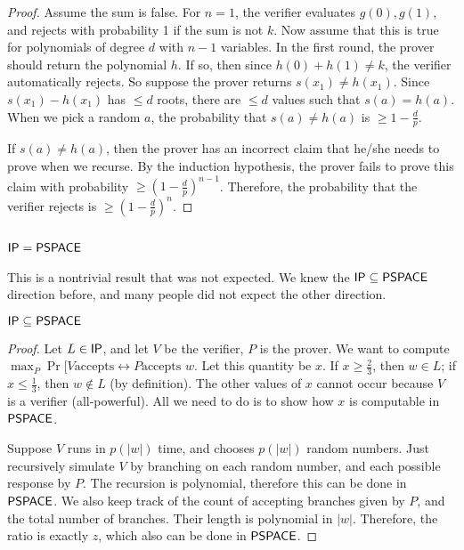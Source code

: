 \begin{proof}
\par Assume the sum is false. For $n=1$, the verifier evaluates $g(0), g(1)$, and rejects with probability 1 if the sum is not $k$. Now assume that this is true for polynomials of degree $d$ with $n-1$ variables. In the first round, the prover should return the polynomial $h$. If so, then since $h(0) + h(1) \ne k$, the verifier automatically rejects. So suppose the prover returns $s(x_1) \ne h(x_1)$. Since $s(x_1) - h(x_1)$ has $\le d$ roots, there are $\le d$ values such that $s(a) = h(a)$. When we pick a random $a$, the probability that $s(a) \ne h(a)$ is $\ge 1-\frac{d}{p}$. 

\par If $s(a) \ne h(a)$, then the prover has an incorrect claim that he/she needs to prove when we recurse. By the induction hypothesis, the prover fails to prove this claim with probability $\ge (1-\frac{d}{p})^{n-1}$. Therefore, the probability that the verifier rejects is $\ge (1-\frac{d}{p})^n$. 
\end{proof}



\subsection{${\mathsf{IP}} = {\mathsf{PSPACE}}$}
This is a nontrivial result that was not expected. We knew the ${\mathsf{IP}} \subseteq {\ensuremath{\mathsf{PSPACE}}}$ direction before, and many people did not expect the other direction. 
\begin{theorem}
${\mathsf{IP}} \subseteq {\ensuremath{\mathsf{PSPACE}}}$
\end{theorem}

\begin{proof}
Let $L \in {\ensuremath{\mathsf{IP}}}$, and let $V$ be the verifier, $P$ is the prover. We want to compute $\max_{P}\Pr[V \text{accepts} \leftrightarrow P \text{accepts $w$}$. Let this quantity be $x$. If $x \ge \frac{2}{3}$, then $w \in L$; if $x \le \frac{1}{3}$, then $w \notin L$ (by definition). The other values of $x$ cannot occur because $V$ is a verifier (all-powerful). All we need to do is to show how $x$ is computable in ${\mathsf{PSPACE}}$.

\par Suppose $V$ runs in $p(|w|)$ time, and chooses $p(|w|)$ random numbers. Just recursively simulate $V$ by branching on each random number, and each possible response by $P$. The recursion is polynomial, therefore this can be done in ${\mathsf{PSPACE}}$. We also keep track of the count of accepting branches given by $P$, and the total number of branches. Their length is polynomial in $|w|$. Therefore, the ratio is exactly $z$, which also can be done in ${\mathsf{PSPACE}}$.
\end{proof}

